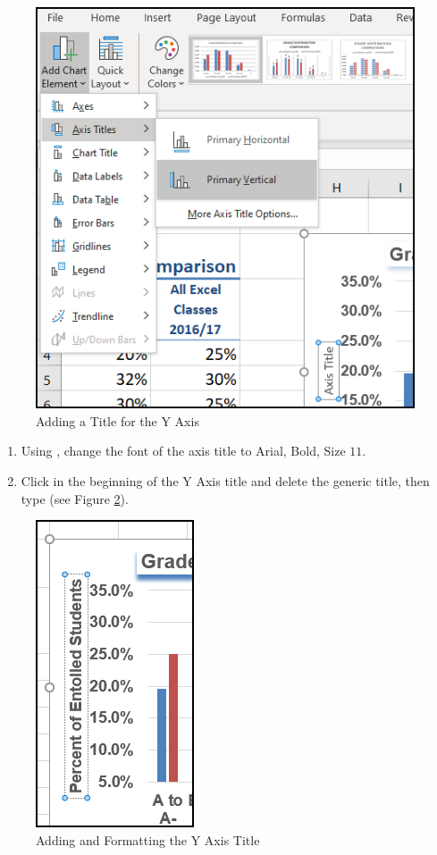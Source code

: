 \begin{figure}[H]
	\centering
	\includegraphics[width=\maxwidth{.95\linewidth}]{gfx/ch04_fig34}
	\caption{Adding a Title for the Y Axis}
	\label{04:fig34}
\end{figure}

\begin{enumerate}
	\item Using , change the font of the axis title to Arial, Bold, Size $ 11 $.
	\item Click in the beginning of the Y Axis title and delete the generic title, then type  (see Figure \ref{04:fig35}).
\end{enumerate}

\begin{figure}[H]
	\centering
	\includegraphics[width=\maxwidth{.95\linewidth}]{gfx/ch04_fig35}
	\caption{Adding and Formatting the Y Axis Title}
	\label{04:fig35}
\end{figure}

